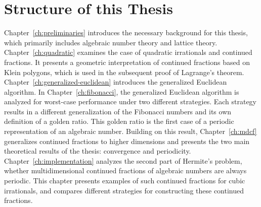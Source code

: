 \section{Structure of this Thesis}
\label{sec:structure}

Chapter~\ref{ch:preliminaries} introduces the necessary background for this thesis,
which primarily includes algebraic number theory and lattice theory.
Chapter~\ref{ch:quadratic} examines the case of quadratic irrationals and continued fractions.
It presents a geometric interpretation of continued fractions based on Klein polygons,
which is used in the subsequent proof of Lagrange's theorem.
Chapter~\ref{ch:generalized-euclidean} introduces the generalized Euclidean algorithm.
In Chapter~\ref{ch:fibonacci}, the generalized Euclidean algorithm is analyzed
for worst-case performance under two different strategies.
Each strategy results in a different generalization of the Fibonacci numbers
and its own definition of a golden ratio.
This golden ratio is the first case of a periodic representation of an algebraic number.
Building on this result, Chapter~\ref{ch:mdcf} generalizes continued fractions to higher dimensions
and presents the two main theoretical results of the thesis: convergence and periodicity.
Chapter~\ref{ch:implementation} analyzes the second part of Hermite's problem,
whether multidimensional continued fractions of algebraic numbers are always periodic.
This chapter presents examples of such continued fractions for cubic irrationals,
and compares different strategies for constructing these continued fractions.
